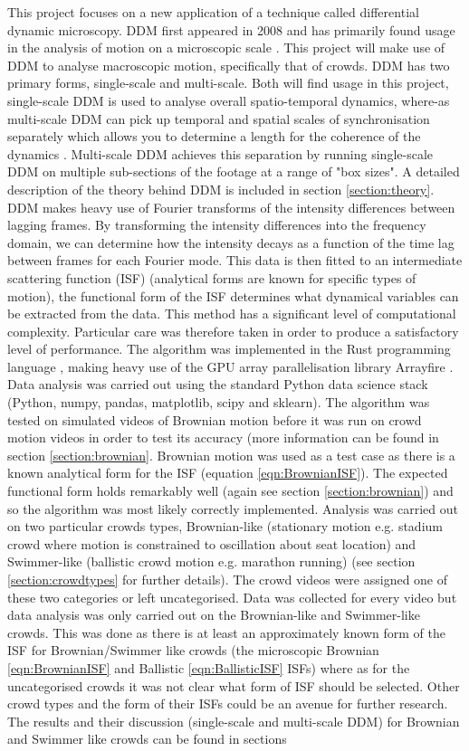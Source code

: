 \documentclass[11pt]{article}
\begin{document}
This project focuses on a new application of a technique called differential dynamic microscopy. DDM first appeared in 2008 \cite{ddm0} and has primarily found usage in the analysis of motion on a microscopic scale \cite{ddm1}. This project will make use of DDM to analyse macroscopic motion, specifically that of crowds. DDM has two primary forms, single-scale and multi-scale. Both will find usage in this project, single-scale DDM is used to analyse overall spatio-temporal dynamics, where-as multi-scale DDM can pick up temporal and spatial scales of synchronisation separately which allows you to determine a length for the coherence of the dynamics \cite{ddm1}. Multi-scale DDM achieves this separation by running single-scale DDM on multiple sub-sections of the footage at a range of "box sizes". A detailed description of the theory behind DDM is included in section \ref{section:theory}. DDM makes heavy use of Fourier transforms of the intensity differences between lagging frames. By transforming the intensity differences into the frequency domain, we can determine how the intensity decays as a function of the time lag between frames for each Fourier mode.  This data is then fitted to an intermediate scattering function (ISF) (analytical forms are known for specific types of motion), the functional form of the ISF determines what dynamical variables can be extracted from the data. This method has a significant level of computational complexity. Particular care was therefore taken in order to produce a satisfactory level of performance. The algorithm was implemented in the Rust programming language \cite{rust}, making heavy use of the GPU array parallelisation library Arrayfire \cite{arrayfire}. Data analysis was carried out using the standard Python data science stack (Python, numpy, pandas, matplotlib, scipy and sklearn). The algorithm was tested on simulated videos of Brownian motion before it was run on crowd motion videos in order to test its accuracy (more information can be found in section \ref{section:brownian}. Brownian motion was used as a test case as there is a known analytical form for the ISF (equation \ref{eqn:BrownianISF}). The expected functional form holds remarkably well (again see section \ref{section:brownian}) and so the algorithm was most likely correctly implemented. Analysis was carried out on two particular crowds types, Brownian-like (stationary motion e.g. stadium crowd where motion is constrained to oscillation about seat location) and Swimmer-like (ballistic crowd motion e.g. marathon running) (see section \ref{section:crowdtypes} for further details). The crowd videos were assigned one of these two categories or left uncategorised. Data was collected for every video but data analysis was only carried out on the Brownian-like and Swimmer-like crowds. This was done as there is at least an approximately known form of the ISF for Brownian/Swimmer like crowds (the microscopic Brownian \ref{eqn:BrownianISF} and Ballistic \ref{eqn:BallisticISF} ISFs) where as for the uncategorised crowds it was not clear what form of ISF should be selected. Other crowd types and the form of their ISFs could be an avenue for further research. The results and their discussion (single-scale and multi-scale DDM) for Brownian and Swimmer like crowds can be found in sections 
\end{document}
